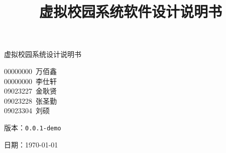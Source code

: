 \ifx\maindoc\undefined
{}
\fi
\title{虚拟校园系统软件设计说明书}



\begin{titlepage}
\vspace*{\fill}

\begin{center}
    {\Huge 虚拟校园系统设计说明书}

    \vspace{10cm}
{\large
00000000~万佰鑫 \\
00000000~李仕轩 \\
09023227~金耿贤 \\
09023228~张圣勤 \\
09023304~刘\phantom{刘}硕
}

    \vspace{0.5cm}
    {\large 版本：\texttt{0.0.1-demo}}

    
\vspace{0.5cm}


    {\large 日期：\today}
\end{center}

\vspace*{\fill}
\end{titlepage}